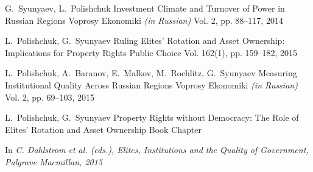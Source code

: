 

\begin{cventries}

  \cventry
    {G.~Syunyaev, L.~Polishchuk} %
    {Investment Climate and Turnover of Power in Russian Regions} %
    {Voprosy Ekonomiki \emph{(in Russian)}} %
    {Vol. 2, pp. 88--117, 2014} %
    {
    }

  \cventry
    {L.~Polishchuk, G.~Syunyaev} %
    {Ruling Elites' Rotation and Asset Ownership: Implications for Property Rights} %
    {Public Choice} %
    {Vol. 162(1), pp. 159--182, 2015} %
    {
    }

  \cventry
    {L.~Polishchuk, A.~Baranov, E.~Malkov, M.~Rochlitz, G.~Syunyaev} %
    {Measuring Institutional Quality Across Russian Regions} %
    {Voprosy Ekonomiki \emph{(in Russian)}} %
    {Vol. 2, pp. 69--103, 2015} %
    {
    }

  \cventry
    {L.~Polishchuk, G.~Syunyaev} %
    {Property Rights without Democracy: The Role of Elites' Rotation and Asset Ownership} %
    {Book Chapter} %
    {} %
    {
      \begin{cvitems} %
        \item {In \emph{C. Dahlstrom et al. (eds.), Elites, Institutions and the Quality of Government, Palgrave Macmillan, 2015}}
      \end{cvitems}
    }

\end{cventries}
